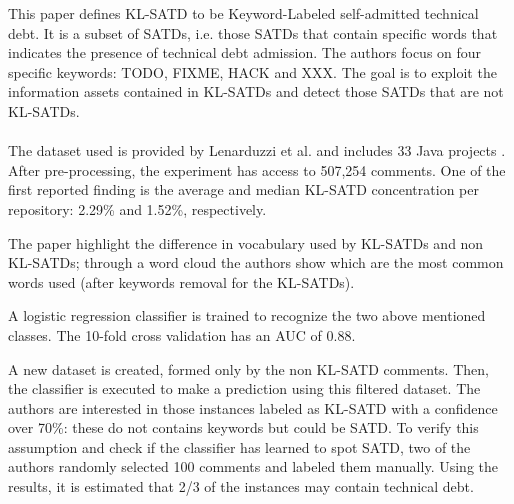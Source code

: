 This paper defines KL-SATD to be Keyword-Labeled self-admitted technical debt. It is a subset of SATDs, i.e. those SATDs that contain specific words that indicates the presence of technical debt admission. The authors focus on four specific keywords: TODO, FIXME, HACK and XXX. The goal is to exploit the information assets contained in KL-SATDs and detect those SATDs that are not KL-SATDs.
\\
\\
The dataset used is provided by Lenarduzzi et al. and includes 33 Java projects \cite{lenarduzzi2019technical}. After pre-processing, the experiment has access to 507,254 comments. One of the first reported finding is the average and median KL-SATD concentration per repository: 2.29\% and 1.52\%, respectively.

The paper highlight the difference in vocabulary used by KL-SATDs and non KL-SATDs; through a word cloud the authors show which are the most common words used (after keywords removal for the KL-SATDs).

A logistic regression classifier is trained to recognize the two above mentioned classes. The 10-fold cross validation has an AUC of 0.88. 


A new dataset is created, formed only by the non KL-SATD comments. Then, the  classifier is executed to make a prediction using this filtered dataset. The authors are interested in those instances labeled as KL-SATD with a confidence over 70\%: these do not contains keywords but could be SATD. To verify this assumption and check if the classifier has learned to spot SATD, two of the authors randomly selected 100 comments and labeled them manually. Using the results, it is estimated that 2/3 of the instances may contain technical debt.








